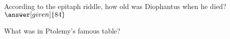 \documentclass[nooutcomes]{ximera}
\begin{document}
\begin{question}
According to the epitaph riddle, how old was Diophantus when he died? $\answer[given]{84}$
\end{question}

\begin{question}
What was in Ptolemy's famous table?
\begin{multipleChoice}
\end{multipleChoice}
\end{question}


%
\end{document}
